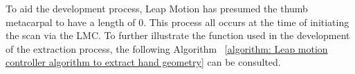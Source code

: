 \renewcommand{\umltextcolor}{black}
\renewcommand{\umldrawcolor}{black}
\renewcommand{\umlfillcolor}{white}

\begin{center}
\end{center}


To aid the development process, Leap Motion has presumed the thumb metacarpal to have a length of 0.
This process all occurs at the time of initiating the scan via the LMC. To further illustrate the function used in the development of the extraction process, the following Algorithm ~\ref{algorithm: Leap motion controller algorithm to extract hand geometry} can be consulted.
    




